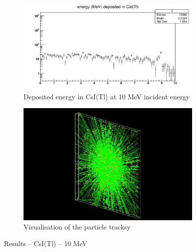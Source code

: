 \documentclass{article}
\begin{document}
\begin{figure}[H]
\centering
\begin{subfigure}{.5\textwidth}
  \centering
  \includegraphics[width=\linewidth]{images/task1/CsI_10MeV.png}
  \caption{Deposited energy in CsI(Tl) at 10 MeV incident energy}  %
\end{subfigure}%
\begin{subfigure}{.5\textwidth}
  \centering
  \includegraphics[width=\linewidth]{images/task1/CsI_10MeV_10000.png}
  \caption{Visualisation of the particle tracksy}
\end{subfigure}
\caption{Results – CsI(Tl) – 10 MeV}  %
\end{figure}
\end{document}
